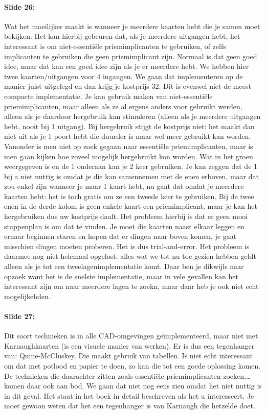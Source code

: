 \documentclass[10pt,a4paper]{book}
\begin{document}
\paragraph{Slide 26:} Wat het moeilijker maakt is wanneer je meerdere kaarten hebt die je samen moet bekijken. Het kan hierbij gebeuren dat, als je meerdere uitgangen hebt, het interessant is om niet-essenti\"ele priemimplicanten te gebruiken, of zelfs implicanten te gebruiken die geen priemimplicant zijn. Normaal is dat geen goed idee, maar dat kan een goed idee zijn als je er meerdere hebt. We hebben hier twee kaarten/uitgangen voor 4 ingangen. We gaan dat implementeren op de manier juist uitgelegd en dan krijg je kostprijs 32. Dit is evenwel niet de meest compacte implementatie. Je kan gebruik maken van niet-essenti\"ele priemimplicanten, maar alleen als ze al ergens anders voor gebruikt werden, alleen als je daardoor hergebruik kan stimuleren (alleen als je meerdere uitgangen hebt, nooit bij 1 uitgang). Bij hergebruik stijgt de kostprijs niet: het maakt dan niet uit als je 1 poort hebt die duurder is maar wel meer gebruikt kan worden.\\ 
Vanonder is men niet op zoek gegaan naar essenti\"ele priemimplicanten, maar is men gaan kijken hoe zoveel mogelijk hergebruikt kon worden. Wat in het groen weergegeven is en de 1 onderaan kan je 2 keer gebruiken. Je kan zeggen dat de 1 bij a niet nuttig is omdat je die kan samennemen met de enen erboven, maar dat zou enkel zijn wanneer je maar 1 kaart hebt, nu gaat dat omdat je meerdere kaarten hebt: het is toch gratis om ze een tweede keer te gebruiken. Bij de twee enen in de derde kolom is geen enkele kaart een priemimplicant, maar je kan het hergebruiken dus uw kostprijs daalt. Het probleem hierbij is dat er geen mooi stappenplan is om dat te vinden. Je moet die kaarten naast elkaar leggen en ernaar beginnen staren en hopen dat er dingen naar boven komen, je gaat misschien dingen moeten proberen. Het is dus trial-and-error. Het probleem is daarmee nog niet helemaal opgelost: alles wat we tot nu toe gezien hebben geldt alleen als je tot een tweelagenimplementatie komt. Daar ben je dikwijls naar opzoek want het is de snelste implementatie, maar in vele gevallen kan het interessant zijn om naar meerdere lagen te zoekn, maar daar heb je ook niet echt mogelijkehden.

\paragraph{Slide 27:} Dit soort technieken is in alle CAD-omgevingen ge\"implementeerd, maar niet met Karnaughkaarten (is een visuele manier van werken). Er is dus een tegenhanger van: Quine-McCluskey. Die maakt gebruik van tabellen. Is niet echt interessant om dat met potlood en papier te doen, zo kan die tot een goede oplossing komen. De technieken die daarachter zitten zoals essenti\"ele priemimplicanten zoeken,\ldots komen daar ook aan bod. We gaan dat niet nog eens zien omdat het niet nuttig is in dit geval. Het staat in het boek in detail beschreven als het u interesseert. Je moet gewoon weten dat het een tegenhanger is van Karnaugh die hetzelde doet.
\end{document}
